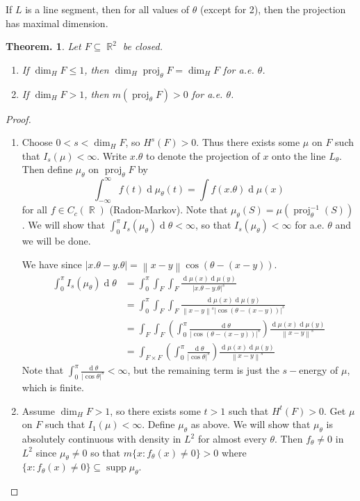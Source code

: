 \documentclass[11pt, a4paper]{memoir}
\DeclareMathOperator{\R}{{\mathbb{R}}}
\newcommand{\norm}[1]{\ensuremath{\left\lVert#1\right\rVert}}
\theoremstyle{change}
\newtheorem{theorem}{Theorem.}[section]
\theoremstyle{plain}
\theoremstyle{nonumberplain}
\newtheorem{proof}{Proof}
\DeclareMathOperator{\supp}{supp}
\renewcommand{\d}[1]{\ensuremath{\operatorname{d}\!{#1}}}
\DeclareMathOperator{\proj}{proj}
\numberwithin{equation}{section}
\begin{document}
If $L$ is a line segment, then for all values of $\theta$ (except for 2), then the projection has maximal dimension.
\begin{theorem}
    Let $F\subseteq\R^2$ be closed.
    \begin{enumerate}[nl,r]
        \item If $\dim_H F\leq 1$, then $\dim_H\proj_\theta F=\dim_H F$ for a.e. $\theta$.
        \item If $\dim_H F>1$, then $m(\proj_\theta F)>0$ for a.e. $\theta$.
    \end{enumerate}
\end{theorem}
\begin{proof}
    \begin{enumerate}[nl,r]
        \item Choose $0<s<\dim_H F$, so $H^s(F)>0$.
            Thus there exists some $\mu$ on $F$ such that $I_s(\mu)<\infty$.
            Write $x.\theta$ to denote the projection of $x$ onto the line $L_\theta$.
            Then define $\mu_\theta$ on $\proj_\theta F$ by
            \begin{equation*}
                \int_{-\infty}^\infty f(t)\d{\mu_\theta(t)}=\int f(x.\theta)\d{\mu(x)}
            \end{equation*}
            for all $f\in C_c(\R)$ (Radon-Markov).
            Note that $\mu_\theta(S)=\mu(\proj_\theta^{-1}(S))$.
            We will show that $\int_0^\pi I_s(\mu_\theta)\d{\theta}<\infty$, so that $I_s(\mu_\theta)<\infty$ for a.e. $\theta$ and we will be done.

            We have since $|x.\theta-y.\theta|=\norm{x-y}\cos(\theta-(x-y))$.
            \begin{align*}
                \int_0^\pi I_s(\mu_\theta)\d{\theta} &= \int_0^\pi \int_F\int_F\frac{\d{\mu(x)}\d{\mu(y)}}{|x.\theta-y.\theta|^s}\\
                                                     &= \int_0^\pi \int_F\int_F\frac{\d{\mu(x)}\d{\mu(y)}}{\norm{x-y}^s|\cos(\theta-(x-y))|^s}\\
                                                     &= \int_F\int_F\left(\int_0^\pi\frac{\d{\theta}}{|\cos(\theta-(x-y))|^s}\right)\frac{\d{\mu(x)}\d{\mu(y)}}{\norm{x-y}^s}\\
                                                     &= \int_{F\times F}\left(\int_0^\pi\frac{\d{\theta}}{|\cos\theta|^s}\right)\frac{\d{\mu(x)}\d{\mu(y)}}{\norm{x-y}^s}
            \end{align*}
            Note that $\int_0^\pi\frac{\d{\theta}}{|\cos\theta|^s}<\infty$, but the remaining term is just the $s-$energy of $\mu$, which is finite.
        \item Assume $\dim_H F>1$, so there exists some $t>1$ such that $H^t(F)>0$.
            Get $\mu$ on $F$ such that $I_1(\mu)<\infty$.
            Define $\mu_\theta$ as above.
            We will show that $\mu_\theta$ is absolutely continuous with density in $L^2$ for almost every $\theta$.
            Then $f_\theta\neq 0$ in $L^2$ since $\mu_\theta\neq 0$ so that $m\{x:f_\theta(x)\neq 0\}>0$ where $\{x:f_\theta(x)\neq 0\}\subseteq\supp\mu_\theta$.


\end{enumerate}
\end{proof}
\end{document}
